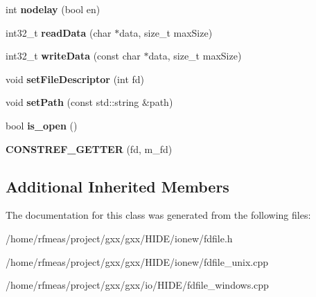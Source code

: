 \begin{DoxyCompactItemize}
\item 
int {\bfseries nodelay} (bool en)\hypertarget{classgxx_1_1io_1_1fdfile_af1f04e5ea0f802ed249e7e70f22e640a}{}\label{classgxx_1_1io_1_1fdfile_af1f04e5ea0f802ed249e7e70f22e640a}

\item 
int32\+\_\+t {\bfseries read\+Data} (char $\ast$data, size\+\_\+t max\+Size)\hypertarget{classgxx_1_1io_1_1fdfile_aab55e428338784966263ce9311c752ea}{}\label{classgxx_1_1io_1_1fdfile_aab55e428338784966263ce9311c752ea}

\item 
int32\+\_\+t {\bfseries write\+Data} (const char $\ast$data, size\+\_\+t max\+Size)\hypertarget{classgxx_1_1io_1_1fdfile_aa6b10070a559b46de324b6a01e7ef7d5}{}\label{classgxx_1_1io_1_1fdfile_aa6b10070a559b46de324b6a01e7ef7d5}

\item 
void {\bfseries set\+File\+Descriptor} (int fd)\hypertarget{classgxx_1_1io_1_1fdfile_a0c30dc106a3dada39e830a2f39a11fed}{}\label{classgxx_1_1io_1_1fdfile_a0c30dc106a3dada39e830a2f39a11fed}

\item 
void {\bfseries set\+Path} (const std\+::string \&path)\hypertarget{classgxx_1_1io_1_1fdfile_a81648e82fc9d5430fb67f8e2ec74c6e6}{}\label{classgxx_1_1io_1_1fdfile_a81648e82fc9d5430fb67f8e2ec74c6e6}

\item 
bool {\bfseries is\+\_\+open} ()\hypertarget{classgxx_1_1io_1_1fdfile_afc7c22aef521c4466e4c6d19a40afd5e}{}\label{classgxx_1_1io_1_1fdfile_afc7c22aef521c4466e4c6d19a40afd5e}

\item 
{\bfseries C\+O\+N\+S\+T\+R\+E\+F\+\_\+\+G\+E\+T\+T\+ER} (fd, m\+\_\+fd)\hypertarget{classgxx_1_1io_1_1fdfile_acdee1a0d8c4f6ea45734ec8a421da42d}{}\label{classgxx_1_1io_1_1fdfile_acdee1a0d8c4f6ea45734ec8a421da42d}

\end{DoxyCompactItemize}
\subsection*{Additional Inherited Members}


The documentation for this class was generated from the following files\+:\begin{DoxyCompactItemize}
\item 
/home/rfmeas/project/gxx/gxx/\+H\+I\+D\+E/ionew/fdfile.\+h\item 
/home/rfmeas/project/gxx/gxx/\+H\+I\+D\+E/ionew/fdfile\+\_\+unix.\+cpp\item 
/home/rfmeas/project/gxx/gxx/io/\+H\+I\+D\+E/fdfile\+\_\+windows.\+cpp\end{DoxyCompactItemize}
